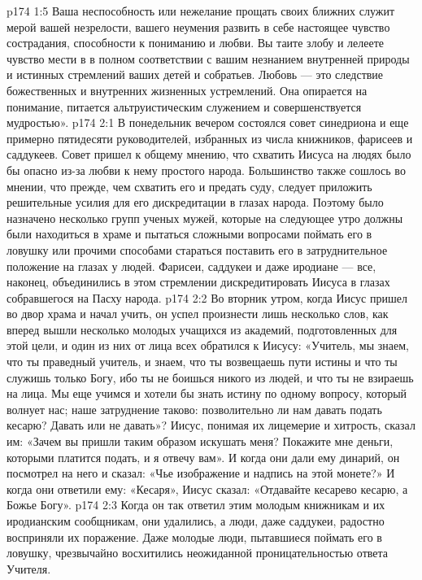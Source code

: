 \vs p174 1:5 Ваша неспособность или нежелание прощать своих ближних служит мерой вашей незрелости, вашего неумения развить в себе настоящее чувство сострадания, способности к пониманию и любви. Вы таите злобу и лелеете чувство мести в в полном соответствии с вашим незнанием внутренней природы и истинных стремлений ваших детей и собратьев. Любовь --- это следствие божественных и внутренних жизненных устремлений. Она опирается на понимание, питается альтруистическим служением и совершенствуется мудростью».
\vs p174 2:1 В понедельник вечером состоялся совет синедриона и еще примерно пятидесяти руководителей, избранных из числа книжников, фарисеев и саддукеев. Совет пришел к общему мнению, что схватить Иисуса на людях было бы опасно из\hyp{}за любви к нему простого народа. Большинство также сошлось во мнении, что прежде, чем схватить его и предать суду, следует приложить решительные усилия для его дискредитации в глазах народа. Поэтому было назначено несколько групп ученых мужей, которые на следующее утро должны были находиться в храме и пытаться сложными вопросами поймать его в ловушку или прочими способами стараться поставить его в затруднительное положение на глазах у людей. Фарисеи, саддукеи и даже иродиане --- все, наконец, объединились в этом стремлении дискредитировать Иисуса в глазах собравшегося на Пасху народа.
\vs p174 2:2 Во вторник утром, когда Иисус пришел во двор храма и начал учить, он успел произнести лишь несколько слов, как вперед вышли несколько молодых учащихся из академий, подготовленных для этой цели, и один из них от лица всех обратился к Иисусу: «Учитель, мы знаем, что ты праведный учитель, и знаем, что ты возвещаешь пути истины и что ты служишь только Богу, ибо ты не боишься никого из людей, и что ты не взираешь на лица. Мы еще учимся и хотели бы знать истину по одному вопросу, который волнует нас; наше затруднение таково: позволительно ли нам давать подать кесарю? Давать или не давать»? Иисус, понимая их лицемерие и хитрость, сказал им: «Зачем вы пришли таким образом искушать меня? Покажите мне деньги, которыми платится подать, и я отвечу вам». И когда они дали ему динарий, он посмотрел на него и сказал: «Чье изображение и надпись на этой монете?» И когда они ответили ему: «Кесаря», Иисус сказал: «Отдавайте кесарево кесарю, а Божье Богу».
\vs p174 2:3 Когда он так ответил этим молодым книжникам и их иродианским сообщникам, они удалились, а люди, даже саддукеи, радостно восприняли их поражение. Даже молодые люди, пытавшиеся поймать его в ловушку, чрезвычайно восхитились неожиданной проницательностью ответа Учителя.
